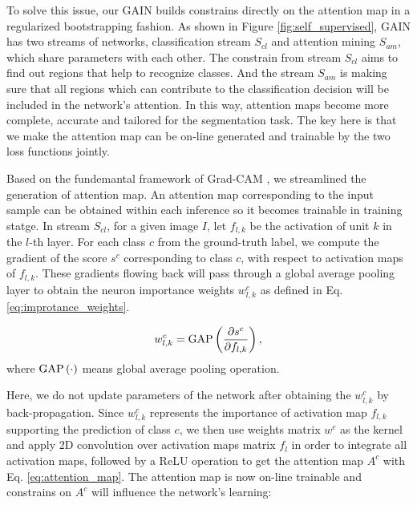 \documentclass[10pt,twocolumn,letterpaper]{article}
\begin{document}
To solve this issue, our GAIN builds constrains directly on the attention map in a regularized bootstrapping fashion. As shown in Figure \ref{fig:self_supervised}, GAIN has two streams of networks, classification stream ${S_{cl}}$ and attention mining ${S_{am}}$, which share parameters with each other. The constrain from stream ${S_{cl}}$ aims to find out regions that help to recognize classes. And the stream ${S_{am}}$ is making sure that all regions which can contribute to the classification decision will be included in the network's attention. In this way, attention maps become more complete, accurate and tailored for the segmentation task. The key here is that we make the attention map can be on-line generated and trainable by the two loss functions jointly.


Based on the fundemantal framework of Grad-CAM \cite{grad-cam}, we streamlined the generation of attention map.  An attention map corresponding to the input sample can be obtained within each inference so it becomes trainable in training statge. In stream ${S_{cl}}$, for a given image $I$, let $f_{l,k}$ be the activation of unit $k$ in the $l$-th layer. For each class $c$ from the ground-truth label, we compute the gradient of the score $s^c$ corresponding to class $c$, with respect to activation maps of $f_{l,k}$. These gradients flowing back will pass through a global average pooling layer \cite{lin2013network} to obtain the neuron importance weights $w_{l,k}^c$ as defined in Eq. \ref{eq:improtance_weights}. 



\begin{equation}
\label{eq:improtance_weights}
w_{l,k}^c = {\mathop{\rm GAP}\nolimits}\left( {\frac{{\partial {s^c}}}{{\partial {f_{l,k}}}}} \right),
\end{equation}
where ${\mathop{\rm GAP}\nolimits} \left(  \cdot  \right)$ means global average pooling operation.


Here, we do not update parameters of the network after obtaining the $w_{l,k}^c$ by back-propagation. Since $w_{l,k}^c$ represents the importance of activation map $f_{l,k}$ supporting the prediction of class $c$, we then use weights matrix $w^c$ as the kernel and apply 2D convolution over activation maps matrix $f_{l}$ in order to integrate all activation maps, followed by a ReLU operation to get the attention map $A^c$ with Eq. \ref{eq:attention_map}. The attention map is now on-line trainable and constrains on $A^c$ will influence the network's learning:
\end{document}
